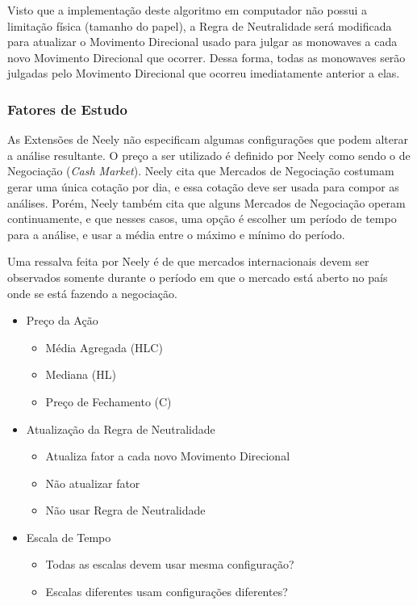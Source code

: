 \documentclass[12pt]{article}
\begin{document}
Visto que a implementação deste algoritmo em computador não possui a limitação física (tamanho
do papel), a Regra de Neutralidade será modificada para atualizar o Movimento Direcional
usado para julgar as monowaves a cada novo Movimento Direcional que ocorrer. Dessa forma,
todas as monowaves serão julgadas pelo Movimento Direcional que ocorreu imediatamente
anterior a elas.

\subsubsection{Fatores de Estudo} \label{sec:AnalysisConfigurations}

As Extensões de Neely não especificam algumas configurações que podem alterar a
análise resultante. O preço a ser utilizado é definido por Neely como sendo o de Negociação
(\textit{Cash Market}). Neely cita que Mercados de Negociação costumam gerar uma única cotação
por dia, e essa cotação deve ser usada para compor as análises. Porém, Neely também cita
que alguns Mercados de Negociação operam continuamente, e que nesses casos, uma opção é
escolher um período de tempo para a análise, e usar a média entre o máximo e mínimo do período.

Uma ressalva feita por Neely é de que mercados internacionais devem ser observados somente
durante o período em que o mercado está aberto no país onde se está fazendo a negociação.

\begin{itemize}
	\item Preço da Ação
	\begin{itemize}
		\item Média Agregada (HLC)
		\item Mediana (HL)
		\item Preço de Fechamento (C)
	\end{itemize}
	\item Atualização da Regra de Neutralidade
	\begin{itemize}
		\item Atualiza fator a cada novo Movimento Direcional
		\item Não atualizar fator
		\item Não usar Regra de Neutralidade
	\end{itemize}
	\item Escala de Tempo
	\begin{itemize}
		\item Todas as escalas devem usar mesma configuração?
		\item Escalas diferentes usam configurações diferentes?
	\end{itemize}
\end{itemize}
\end{document}
